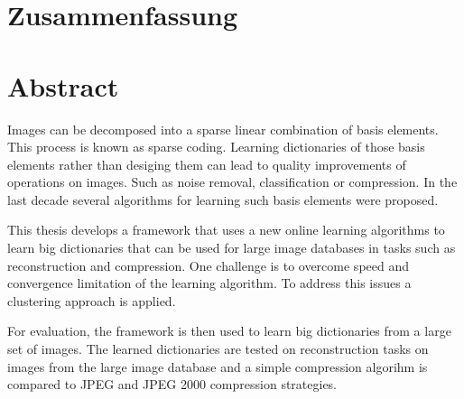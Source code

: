 \newpage
{}
{}
\chapter*{Zusammenfassung}
\thispagestyle{empty}

\newpage
{}
{}
\chapter*{Abstract}
\thispagestyle{empty}

Images can be decomposed into a sparse linear combination of basis
elements. This process is known as sparse coding. Learning dictionaries of
those basis elements rather than desiging them can lead to quality improvements
of operations on images. Such as noise removal, classification or compression.
In the last decade several algorithms for learning such basis elements were
proposed.

This thesis develops a framework that uses a new online learning
algorithms to learn big dictionaries that can be used for large image databases
in tasks such as reconstruction and compression. One challenge is to overcome
speed and convergence limitation of the learning algorithm. To address this
issues a clustering approach is applied. 

For evaluation, the framework is then used to learn big dictionaries from a
large set of images. The learned dictionaries are tested on reconstruction
tasks on images from the large image database and a simple compression algorihm
is compared to JPEG and JPEG 2000 compression strategies. 



